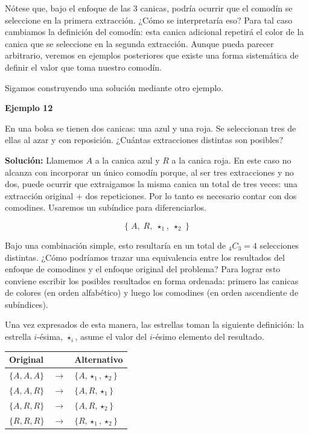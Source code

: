 \documentclass[
  letterpaper,
  DIV=11,
  numbers=noendperiod]{scrreprt}
\begin{document}
Nótese que, bajo el enfoque de las 3 canicas, podría ocurrir que el
comodín se seleccione en la primera extracción. ¿Cómo se interpretaría
eso? Para tal caso cambiamos la definición del comodín: esta canica
adicional repetirá el color de la canica que se seleccione en la segunda
extracción. Aunque pueda parecer arbitrario, veremos en ejemplos
posteriores que existe una forma sistemática de definir el valor que
toma nuestro comodín.

Sigamos construyendo una solución mediante otro ejemplo.

\begin{examplebox}

\begin{center}
\textbf{Ejemplo 12}

\end{center}

En una bolsa se tienen dos canicas: una azul y una roja. Se seleccionan
tres de ellas al azar y con reposición. ¿Cuántas extracciones distintas
son posibles?

\textbf{Solución:} Llamemos \(A\) a la canica azul y \(R\) a la canica
roja. En este caso no alcanza con incorporar un único comodín porque, al
ser tres extracciones y no dos, puede ocurrir que extraigamos la misma
canica un total de tres veces: una extracción original + dos
repeticiones. Por lo tanto es necesario contar con dos comodines.
Usaremos un subíndice para diferenciarlos.

\[\{\; A, \; R, \; \star_1, \; \star_2 \;\}\]

Bajo una combinación simple, esto resultaría en un total de
\(_4C_3 = 4\) selecciones distintas. ¿Cómo podríamos trazar una
equivalencia entre los resultados del enfoque de comodines y el enfoque
original del problema? Para lograr esto conviene escribir los posibles
resultados en forma ordenada: primero las canicas de colores (en orden
alfabético) y luego los comodines (en orden ascendiente de subíndices).

Una vez expresados de esta manera, las estrellas toman la siguiente
definición: la estrella \(i\)-ésima, \(\star_i\), asume el valor del
\(i\)-ésimo elemento del resultado.

\begin{flexcenter}

\begin{half}

\begin{longtable}[]{@{}lll@{}}
\toprule\noalign{}
Original & & Alternativo \\
\midrule\noalign{}
\endhead
\bottomrule\noalign{}
\endlastfoot
\(\{A,A,A\}\) & \(\longrightarrow\) & \(\{A,\star_1,\star_2\}\) \\
\(\{A,A,R\}\) & \(\longrightarrow\) & \(\{A,R,\star_1\}\) \\
\(\{A,R,R\}\) & \(\longrightarrow\) & \(\{A,R,\star_2\}\) \\
\(\{R,R,R\}\) & \(\longrightarrow\) & \(\{R,\star_1,\star_2\}\) \\
\end{longtable}


\end{half}
\end{flexcenter}
\end{examplebox}
\end{document}
